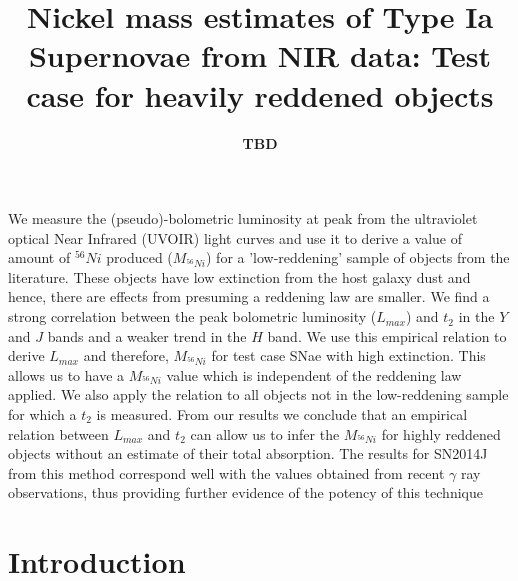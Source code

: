 \documentclass{aa}
\begin{document}
%
\title{Nickel mass estimates of Type Ia Supernovae from NIR data: Test case for heavily reddened objects
}


\author{\textbf{TBD}}%




{We measure the  (pseudo)-bolometric luminosity at peak from the ultraviolet optical Near Infrared (UVOIR) light curves  and use it to derive a value of amount of $^{56}Ni$ produced ($M_{^{56}Ni}$) for a 'low-reddening' sample of objects from the literature. These objects have low extinction from the host galaxy dust and hence, there are effects from presuming a reddening law are smaller.   }
{We find a strong correlation between the peak bolometric luminosity ($L_{max}$) and $t_2$ in the $Y$ and $J$ bands and a weaker trend in the $H$ band. We use this empirical relation to derive $L_{max}$ and therefore,  $M_{^{56}Ni}$ for test case SNae with high extinction. This allows us to have a $M_{^{56}Ni}$ value which is independent of the reddening law applied. We also apply the relation to all objects not in the low-reddening sample for which a $t_2$ is measured.}
{From our results we conclude that an empirical relation between  $L_{max}$ and $t_2$ can allow us to infer the  $M_{^{56}Ni}$ for highly reddened objects without an estimate of their total absorption. The results for SN2014J from this method correspond well with the values obtained from recent $\gamma$ ray observations, thus providing further evidence of the potency of this technique}



\maketitle
\section{Introduction}
\label{sec-intro}
\end{document}
